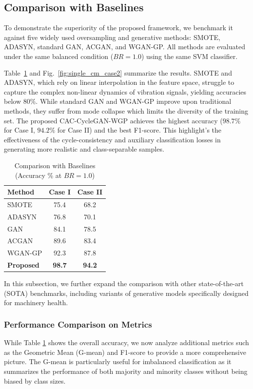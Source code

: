 \subsection{Comparison with Baselines}
To demonstrate the superiority of the proposed framework, we benchmark it against five widely used oversampling and generative methods: SMOTE, ADASYN, standard GAN, ACGAN, and WGAN-GP. All methods are evaluated under the same balanced condition ($BR=1.0$) using the same SVM classifier.

Table~\ref{tab:comparison} and Fig.~\ref{fig:single_cm_case2} summarize the results. SMOTE and ADASYN, which rely on linear interpolation in the feature space, struggle to capture the complex non-linear dynamics of vibration signals, yielding accuracies below $80\%$. While standard GAN and WGAN-GP improve upon traditional methods, they suffer from mode collapse which limits the diversity of the training set. The proposed CAC-CycleGAN-WGP achieves the highest accuracy ($98.7\%$ for Case I, $94.2\%$ for Case II) and the best F1-score. This highlight's the effectiveness of the cycle-consistency and auxiliary classification losses in generating more realistic and class-separable samples.

\begin{table}[htbp]
\centering
\caption{Comparison with Baselines (Accuracy \% at $BR=1.0$)}
\label{tab:comparison}
\begin{tabular}{lcc}
\hline
\textbf{Method} & \textbf{Case I} & \textbf{Case II} \\ \hline
SMOTE \cite{chawla2002smote} & 75.4 & 68.2 \\
ADASYN \cite{he2008adasyn} & 76.8 & 70.1 \\
GAN \cite{goodfellow2014gan} & 84.1 & 78.5 \\
ACGAN \cite{odena2017acgan} & 89.6 & 83.4 \\
WGAN-GP \cite{gulrajani2017wgangp} & 92.3 & 87.8 \\
\textbf{Proposed} & \textbf{98.7} & \textbf{94.2} \\
\hline
\end{tabular}
\end{table}

In this subsection, we further expand the comparison with other state-of-the-art (SOTA) benchmarks, including variants of generative models specifically designed for machinery health.

\subsubsection{Performance Comparison on Metrics}
While Table \ref{tab:comparison} shows the overall accuracy, we now analyze additional metrics such as the Geometric Mean (G-mean) and F1-score to provide a more comprehensive picture. The G-mean is particularly useful for imbalanced classification as it summarizes the performance of both majority and minority classes without being biased by class sizes.

